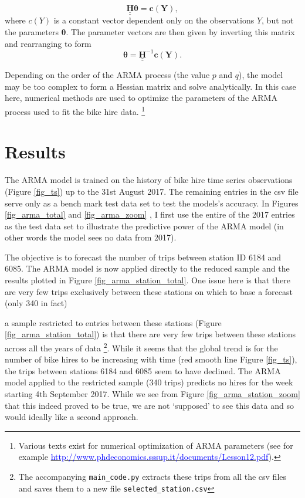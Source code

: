 \documentclass[10pt]{article}
\begin{document}
\begin{equation}
\label{eq_hes}
\underline{\underline{\mathbf{H}}} \mathbf{\theta} = \mathbf{c(Y)},
\end{equation}
\noindent where $c(Y)$ is a constant vector dependent only on the observations $Y$, but not the parameters $\mathbf{\theta}$. The parameter vectors are then given by inverting this matrix and rearranging to form 
\begin{equation}
\label{eq_hespars}
\mathbf{\theta} = \underline{\underline{\mathbf{H}}}^{-1} \mathbf{c(Y)}.
\end{equation}

\noindent Depending on the order of the ARMA  process (the value $p$ and $q$), the model may be too complex to form a Hessian matrix and solve analytically. In this case here, numerical methods are used to optimize the parameters of the ARMA process used to fit the bike hire data. \footnote{Various texts exist for numerical optimization of ARMA  parameters (see for example \href{ http://www.phdeconomics.sssup.it/documents/Lesson12.pdf}{\textcolor{blue}{http://www.phdeconomics.sssup.it/documents/Lesson12.pdf}}).}








\section{Results}
\label{sec_results}
The ARMA model is trained on the history of bike hire time series observations (Figure \ref{fig_ts}) up to the 31st August 2017. The remaining entries in the csv file serve only as a bench mark test data set to test the models's accuracy. In Figures \ref{fig_arma_total} and \ref{fig_arma_zoom} , I first use the entire of the 2017 entries as the test data set to illustrate the predictive power of the ARMA model (in other words the model sees no data from 2017).


The objective is to forecast the number of trips between station ID 6184 and 6085. The ARMA model is now applied directly to the reduced sample and the results plotted in Figure \ref{fig_arma_station_total}. One issue here is that there are very few trips exclusively between these stations on which to base a forecast (only 340 in fact)


a sample restricted to entries between these stations (Figure \ref{fig_arma_station_total}) is that there are very few trips between these stations across all the years of data \footnote{The accompanying \verb|main_code.py| extracts these trips from all the csv files and saves them to a new file \verb|selected_station.csv|}. While it seems that the global trend is for the number of bike hires to be increasing with time (red smooth line Figure \ref{fig_ts}), the trips between stations 6184 and 6085 seem to have declined. The ARMA model applied to the restricted sample (340 trips) predicts no hires for the week starting 4th September 2017. While we see from Figure \ref{fig_arma_station_zoom} that this indeed proved to be true, we are not `supposed' to see this data and so would ideally like a second approach.
\end{document}
